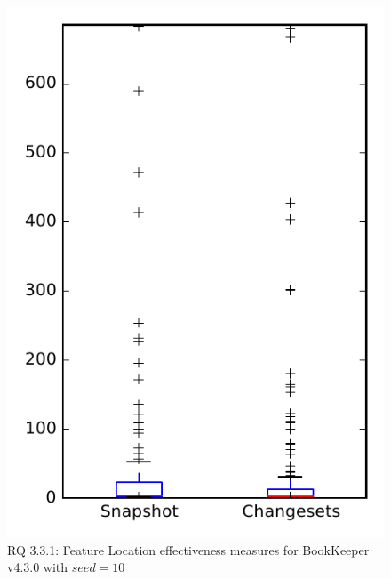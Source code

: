 
\begin{figure}
\centering
\includegraphics[height=0.4\textheight]{figures/flt_seed/rq1_bookkeeper_10}
\caption{RQ 3.3.1: Feature Location effectiveness measures for BookKeeper v4.3.0 with $seed=10$}
\label{fig:flt_seed:rq1:bookkeeper}
\end{figure}
